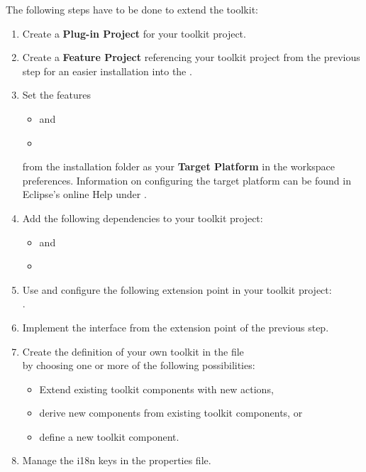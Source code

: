 The following steps have to be done to extend the \ite{} toolkit:
\begin{enumerate}
 \item Create a \textbf{Plug-in Project} for your toolkit project.
 \item Create a \textbf{Feature Project} referencing your toolkit project from
 the previous step for an easier installation into the \ite{}.
 \item Set the features
       \begin{itemize}
        \item {} and
        \item {}
       \end{itemize}
       from the \app{} installation folder \bxshell{\MakeLowercase{\app{}}/} as
       your \textbf{Target Platform} in the workspace preferences. Information
       on configuring the target platform can be found in Eclipse's online Help
       under .
 \item Add the following dependencies to your toolkit project:
       \begin{itemize}
        \item {} and
        \item {}
       \end{itemize}
 \item Use and configure the following extension point in your toolkit
       project:\\
       .
 \item Implement the interface  from the extension
 point of the previous step.
 \item Create the definition of your own toolkit in the file\\
        by choosing one or more of the following
       possibilities:
       \begin{itemize}
        \item Extend existing toolkit components with new actions,
        \item derive new components from existing toolkit components, or
        \item define a new toolkit component.
       \end{itemize}
 \item Manage the i18n keys in the properties file.
\end{enumerate}

